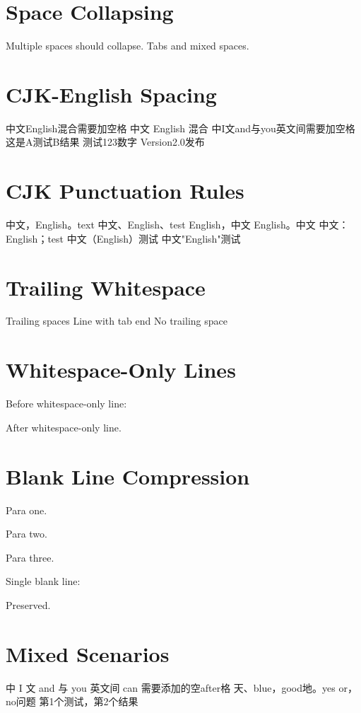 \documentclass{article}
\begin{document}
\section{Space Collapsing}
Multiple   spaces   should   collapse.
Tabs	and	mixed   spaces.

\section{CJK-English Spacing}
中文English混合需要加空格
中文   English   混合
中I文and与you英文间需要加空格
这是A测试B结果
测试123数字
Version2.0发布

\section{CJK Punctuation Rules}
中文，English。text
中文、English、test
English，中文
English。中文
中文：English；test
中文（English）测试
中文"English"测试

\section{Trailing Whitespace}
Trailing spaces
Line with tab end
No trailing space

\section{Whitespace-Only Lines}
Before whitespace-only line:

After whitespace-only line.

\section{Blank Line Compression}
Para one.



Para two.




Para three.

Single blank line:

Preserved.

\section{Mixed Scenarios}
中 I 文 and 与 you 英文间 can 需要添加的空after格
天、blue，good地。yes or，no问题
第1个测试，第2个结果
\end{document}
